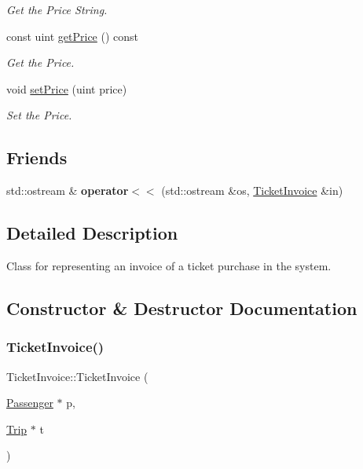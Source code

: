 \begin{DoxyCompactItemize}
\begin{DoxyCompactList}\small\item\em Get the Price String. \end{DoxyCompactList}\item 
const uint \mbox{\hyperlink{classTicketInvoice_a3758bface685702a6229d617691663e1}{get\+Price}} () const
\begin{DoxyCompactList}\small\item\em Get the Price. \end{DoxyCompactList}\item 
void \mbox{\hyperlink{classTicketInvoice_afeed9962f0276861876a001e372d2063}{set\+Price}} (uint price)
\begin{DoxyCompactList}\small\item\em Set the Price. \end{DoxyCompactList}\end{DoxyCompactItemize}
\subsection*{Friends}
\begin{DoxyCompactItemize}
\item 
\mbox{\label{classTicketInvoice_ae78ba81ba79ed7e8c9e8cd23a910f00d}} 
std\+::ostream \& {\bfseries operator$<$$<$} (std\+::ostream \&os, \mbox{\hyperlink{classTicketInvoice}{Ticket\+Invoice}} \&in)
\end{DoxyCompactItemize}


\subsection{Detailed Description}
Class for representing an invoice of a ticket purchase in the system. 

\subsection{Constructor \& Destructor Documentation}
\mbox{\label{classTicketInvoice_a38b37e5168ce71bbf37aceef8a6f6267}} 
\subsubsection{\texorpdfstring{Ticket\+Invoice()}{TicketInvoice()}}
{\footnotesize\ttfamily Ticket\+Invoice\+::\+Ticket\+Invoice (\begin{DoxyParamCaption}\item[{\mbox{\hyperlink{classPassenger}{Passenger}} $\ast$}]{p,  }\item[{\mbox{\hyperlink{classTrip}{Trip}} $\ast$}]{t }\end{DoxyParamCaption})}



